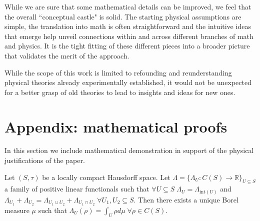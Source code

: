\documentclass[smallextended]{svjour3}
\numberwithin{equation}{section}
\begin{document}
While we are sure that some mathematical details can be improved, we feel that the overall ``conceptual castle" is solid. The starting physical assumptions are simple, the translation into math is often straightforward and the intuitive ideas that emerge help unveil connections within and across different branches of math and physics. It is the tight fitting of these different pieces into a broader picture that validates the merit of the approach.

While the scope of this work is limited to refounding and reunderstanding physical theories already experimentally established, it would not be unexpected for a better grasp of old theories to lead to insights and ideas for new ones.



\section{Appendix: mathematical proofs}

In this section we include mathematical demonstration in support of the physical justifications of the paper.

\begin{thrm}\label{extended_riesz_theorem}
	Let $(S, \tau)$ be a locally compact Hausdorff space. Let $\Lambda = \{\Lambda_U : C(S) \rightarrow \mathbb{R}\}_{U \subseteq S}$ a family of positive linear functionals such that $\forall U \subseteq S \; \Lambda_U = \Lambda_{\mathrm{int}(U)}$ and $\Lambda_{U_1} + \Lambda_{U_2} = \Lambda_{U_1 \cup U_2} + \Lambda_{U_1 \cap U_2} \; \forall U_1, U_2 \subseteq S$. Then there exists a unique Borel measure $\mu$ such that $\Lambda_U (\rho) = \int_{U} \rho d\mu \; \forall \rho \in C(S)$.
\end{thrm}
\end{document}
